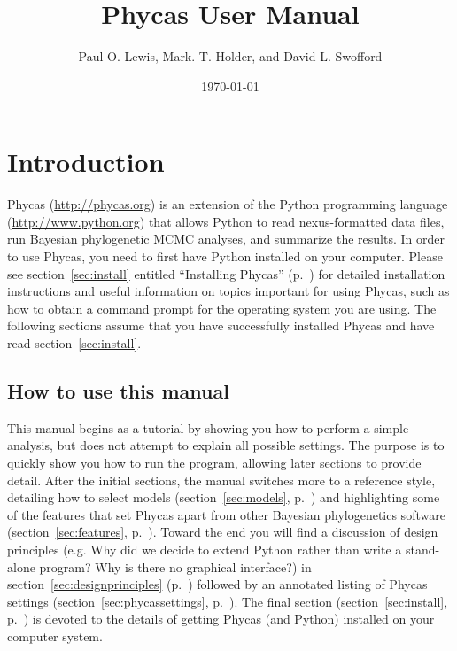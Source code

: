 \documentclass[10pt]{article}
\begin{document}
\title{Phycas User Manual}
\author{Paul O. Lewis, Mark. T. Holder, and David L. Swofford}
\date{\today}
\maketitle

\tableofcontents

\section{Introduction}

Phycas (\url{http://phycas.org}) is an extension of the Python programming language (\url{http://www.python.org}) that allows Python to read nexus-formatted data files, run Bayesian phylogenetic MCMC analyses, and summarize the results. In order to use Phycas, you need to first have Python installed on your computer. Please see section~\ref{sec:install} entitled ``Installing Phycas'' (p.~\pageref{sec:install}) for detailed installation instructions and useful information on topics important for using Phycas, such as how to obtain a command prompt for the operating system you are using. The following sections assume that you have successfully installed Phycas and have read section~\ref{sec:install}.

\subsection{How to use this manual}

This manual begins as a tutorial by showing you how to perform a simple analysis, but does not attempt to explain all possible settings. The purpose is to quickly show you how to run the program, allowing later sections to provide detail. After the initial sections, the manual switches more to a reference style, detailing how to select models (section~\ref{sec:models}, p.~\pageref{sec:models}) and highlighting some of the features that set Phycas apart from other Bayesian phylogenetics software (section~\ref{sec:features}, p.~\pageref{sec:features}). Toward the end you will find a discussion of design principles (e.g. Why did we decide to extend Python rather than write a stand-alone program? Why is there no graphical interface?) in section~\ref{sec:designprinciples} (p.~\pageref{sec:designprinciples}) followed by an annotated listing of Phycas settings (section~\ref{sec:phycassettings}, p.~\pageref{sec:phycassettings}). The final section (section~\ref{sec:install}, p.~\pageref{sec:install}) is devoted to the details of getting Phycas (and Python) installed on your computer system.
\end{document}
